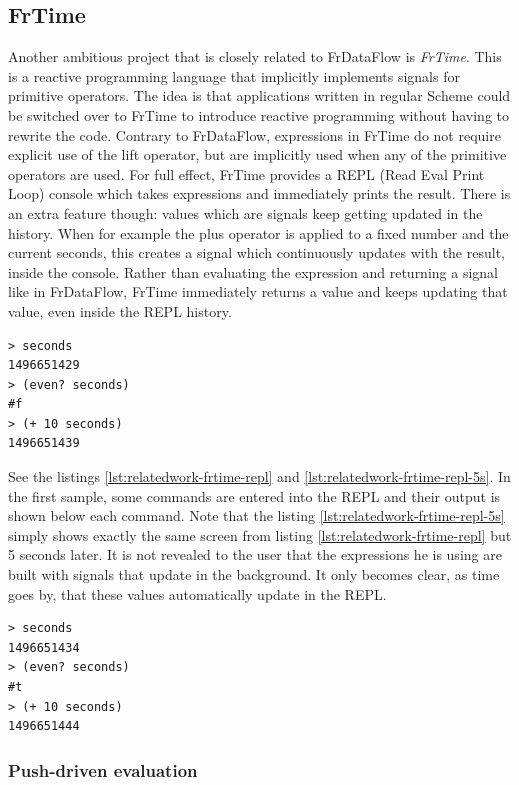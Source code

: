 \subsection{FrTime}

Another ambitious project that is closely related to FrDataFlow is \textit{FrTime}. This is a reactive programming language that implicitly implements signals for primitive operators. The idea is that applications written in regular Scheme could be switched over to FrTime to introduce reactive programming without having to rewrite the code. Contrary to FrDataFlow, expressions in FrTime do not require explicit use of the lift operator, but are implicitly used when any of the primitive operators are used. For full effect, FrTime provides a REPL (Read Eval Print Loop) console which takes expressions and immediately prints the result. There is an extra feature though: values which are signals keep getting updated in the history. When for example the plus operator is applied to a fixed number and the current seconds, this creates a signal which continuously updates with the result, inside the console. Rather than evaluating the expression and returning a signal like in FrDataFlow, FrTime immediately returns a value and keeps updating that value, even inside the REPL history. 

\begin{lstlisting}[caption={REPL in FrTime},captionpos=b,label={lst:relatedwork-frtime-repl}]
> seconds 			
1496651429
> (even? seconds) 
#f
> (+ 10 seconds)
1496651439
\end{lstlisting}

See the listings \ref{lst:relatedwork-frtime-repl} and \ref{lst:relatedwork-frtime-repl-5s}. In the first sample, some commands are entered into the REPL and their output is shown below each command.
Note that the listing \ref{lst:relatedwork-frtime-repl-5s} simply shows exactly the same screen from listing \ref{lst:relatedwork-frtime-repl} but 5 seconds later. It is not revealed to the user that the expressions he is using are built with signals that update in the background. It only becomes clear, as time goes by, that these values automatically update in the REPL.

\begin{lstlisting}[caption={REPL in FrTime, 5 seconds later},captionpos=b,label={lst:relatedwork-frtime-repl-5s}]
> seconds
1496651434
> (even? seconds)
#t
> (+ 10 seconds)
1496651444
\end{lstlisting}

\subsubsection{Push-driven evaluation}

